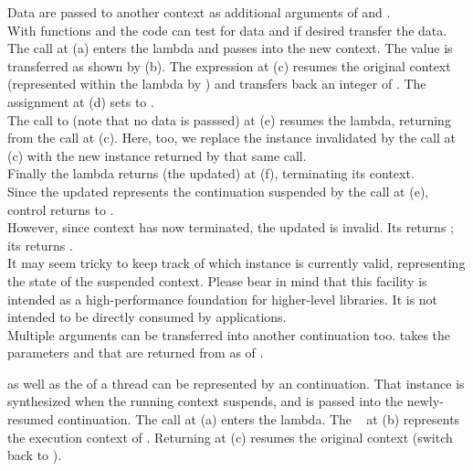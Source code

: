Data are passed to another context as additional arguments of \call and
\resume.\\
With functions \davail and \dtransfer the code can test for data and if desired
transfer the data.
The  call at (a) enters the lambda and passes  into the
new context. The value is transferred as shown by (b). The expression
 at (c) resumes the original context (represented
within the lambda by ) and transfers back an integer of .
The assignment at (d) sets  to .\\
The call to  (note that no data is passsed) at (e) resumes the
 lambda, returning from the  call at (c). Here, too,
we replace the \cont instance  invalidated by the \resume call at (c)
with the new instance returned by that same \resume call.\\
Finally the lambda returns (the updated)  at (f), terminating its
context.\\
Since the updated  represents the continuation suspended by the call at
(e), control returns to \main.\\
However, since context  has now terminated, the updated  is
invalid. Its \opbool returns ; its  returns
.\\
It may seem tricky to keep track of which \cont instance is currently valid,
representing the state of the suspended context. Please bear in mind that this
facility is intended as a high-performance foundation for higher-level
libraries. It is not intended to be directly consumed by applications.\\
Multiple arguments can be transferred into another continuation too.
\call takes the parameters  and  that are returned from \dtransfer
as  of .


\label{subsec:main}

\main as well as the \entryfn of a thread can be represented by an continuation.
That \cont instance is synthesized when the running context suspends, and is
passed into the newly-resumed continuation.
The  call at (a) enters the lambda. The \cont\  at (b)
represents the execution context of \main. Returning  at (c) resumes the
original context (switch back to \main).


